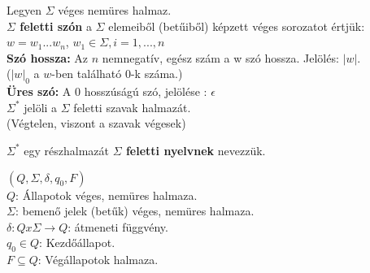 \documentclass{beamer}
\newcommand{\mmedskip}{\vspace{0.5em}}
\begin{document}
\begin{frame}
\begin{tcolorbox}[title={Def.: $\Sigma$ feletti szó}]
Legyen $\Sigma$ véges nemüres halmaz.\\
\mmedskip
\textbf{$\Sigma$ feletti szón} a $\Sigma$ elemeiből (betűiből) képzett véges sorozatot értjük: \\
\mmedskip
$w = w_1 ... w_n$, $w_1 \in {\Sigma}, i = 1, ..., n$\\
\mmedskip
\textbf{Szó hossza:} Az $n$ nemnegatív, egész szám a w szó hossza. Jelölés: $|w|$.\\
($|w|_0$ a $w$-ben található $0$-k száma.)\\
\mmedskip
\textbf{Üres szó:} A $0$ hosszúságú szó, jelölése : $\epsilon$\\
\mmedskip
${\Sigma}^*$ jelöli a $\Sigma$ feletti szavak halmazát.\\
(Végtelen, viszont a szavak végesek)
\end{tcolorbox}

\begin{tcolorbox}[title={Def.: $\Sigma$ feletti nyelv}]
${\Sigma}^*$ egy részhalmazát \textbf{$\Sigma$ feletti nyelvnek} nevezzük.
\end{tcolorbox}

\begin{tcolorbox}[title={Def.: Véges automata}]
\textbf{$(Q, {\Sigma}, {\delta}, q_0, F)$}\\
\mmedskip
$Q$: Állapotok véges, nemüres halmaza.\\
\mmedskip
$\Sigma$: bemenő jelek (betűk) véges, nemüres halmaza.\\
\mmedskip
$\delta : Q x \Sigma \rightarrow Q$: átmeneti függvény.\\
\mmedskip
$q_0 \in Q$: Kezdőállapot.\\
\mmedskip
$F \subseteq Q$: Végállapotok halmaza.\\
\end{tcolorbox}

\end{frame}
\end{document}
